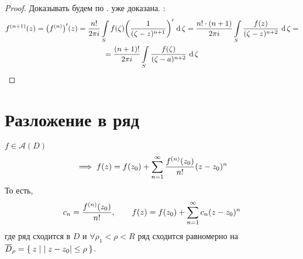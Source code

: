 \begin{proof}
	Доказывать будем по .  уже доказана. :
	\begin{multline*}
		\nder[n + 1]f(z) = \big( \nder f \big)'(z) = \frac{n!}{2\pi i} \cint[\zeta]S{f(\zeta) \bigg( \frac1{(\zeta - z)^{n + 1}} \bigg)'} = \frac{n! \cdot (n + 1)}{2\pi i} \cint[\zeta]S{\frac{f(z)}{(\zeta - z)^{n + 2}}} = \\
		= \frac{(n + 1)!}{2\pi i} \cint[\zeta]S{\frac{f(\zeta)}{(\zeta - a)^{n + 2}}}
	\end{multline*}
\end{proof}

\section{Разложение  в ряд}

\begin{theorem}
	$ f \in \mathcal A(D) $
	$$ \implies f(z) = f(z_0) + \sum_{n = 1}^\infty \frac{\nder f(z_0)}{n!} (z - z_0)^n $$
	То есть,
	$$ c_n = \frac{\nder f(z_0)}{n!}, \qquad f(z) = f(z_0) + \sum_{n = 1}^\infty c_n(z - z_0)^n $$
	где ряд сходится в $ D $ и $ \forall \rho_1 < \rho < R $ ряд сходится равномерно на $ \ol D_\rho = \set{z \mid |z - z_0| \le \rho} $.
\end{theorem}

